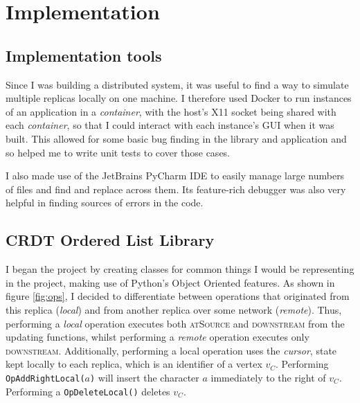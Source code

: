 \documentclass[diss.tex]{subfiles}
\begin{document}
\chapter{Implementation}
\label{chap:implementation}
\section{Implementation tools}
Since I was building a distributed system, it was useful to find a way to simulate multiple replicas locally on one machine. I therefore used Docker \cite{docker} to run instances of an application in a \textit{container}, with the host's X11 socket being shared with each \textit{container}, so that I could interact with each instance's GUI when it was built. This allowed for some basic bug finding in the library and application and so helped me to write unit tests to cover those cases.

I also made use of the JetBrains PyCharm IDE \cite{pycharm} to easily manage large numbers of files and find and replace across them. Its feature-rich debugger was also very helpful in finding sources of errors in the code. 

\section{CRDT Ordered List Library}
I began the project by creating classes for common things I would be representing in the project, making use of Python's Object Oriented features. As shown in figure \ref{fig:ops}, I decided to differentiate between operations that originated from this replica (\textit{local}) and from another replica over some network (\textit{remote}). Thus, performing a \textit{local} operation executes both \textsc{atSource} and \textsc{downstream} from the updating functions, whilst performing a \textit{remote} operation executes only \textsc{downstream}. Additionally, performing a local operation uses the \textit{cursor}, state kept locally to each replica, which is an identifier of a vertex $v_C$. Performing \texttt{OpAddRightLocal($a$)} will insert the character $a$ immediately to the right of $v_C$. Performing a \texttt{OpDeleteLocal()} deletes $v_C$.
\end{document}
